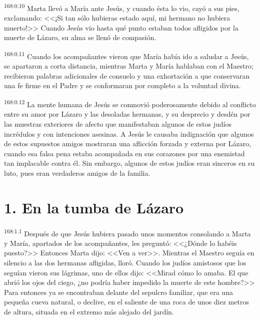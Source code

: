 \par 
\textsuperscript{168:0.10} Marta llevó a María ante Jesús, y cuando ésta lo vio, cayó a sus pies, exclamando: <<¡Si tan sólo hubieras estado aquí, mi hermano no hubiera muerto!>> Cuando Jesús vio hasta qué punto estaban todos afligidos por la muerte de Lázaro, su alma se llenó de compasión.

\par 
\textsuperscript{168:0.11} Cuando los acompañantes vieron que María había ido a saludar a Jesús, se apartaron a corta distancia, mientras Marta y María hablaban con el Maestro; recibieron palabras adicionales de consuelo y una exhortación a que conservaran una fe firme en el Padre y se conformaran por completo a la voluntad divina.

\par 
\textsuperscript{168:0.12} La mente humana de Jesús se conmovió poderosamente debido al conflicto entre su amor por Lázaro y las desoladas hermanas, y su desprecio y desdén por las muestras exteriores de afecto que manifestaban algunos de estos judíos incrédulos y con intenciones asesinas. A Jesús le causaba indignación que algunos de estos supuestos amigos mostraran una aflicción forzada y externa por Lázaro, cuando esa falsa pena estaba acompañada en sus corazones por una enemistad tan implacable contra él. Sin embargo, algunos de estos judíos eran sinceros en su luto, pues eran verdaderos amigos de la familia.

\section*{1. En la tumba de Lázaro}
\par 
\textsuperscript{168:1.1} Después de que Jesús hubiera pasado unos momentos consolando a Marta y María, apartados de los acompañantes, les preguntó: <<¿Dónde lo habéis puesto?>> Entonces Marta dijo: <<Ven a ver>>. Mientras el Maestro seguía en silencio a las dos hermanas afligidas, lloró. Cuando los judíos amistosos que los seguían vieron sus lágrimas, uno de ellos dijo: <<Mirad cómo lo amaba. El que abrió los ojos del ciego, ¿no podría haber impedido la muerte de este hombre?>> Para entonces ya se encontraban delante del sepulcro familiar, que era una pequeña cueva natural, o declive, en el saliente de una roca de unos diez metros de altura, situada en el extremo más alejado del jardín.

